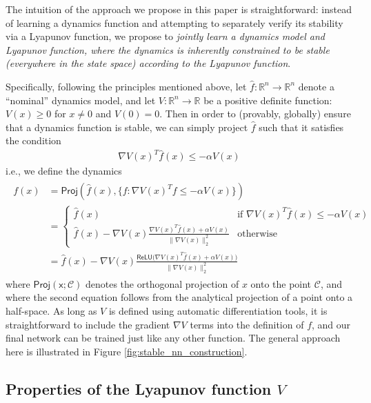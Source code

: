 The intuition of the approach we propose in this paper is straightforward: instead of learning a dynamics function and attempting to separately verify its stability via a Lyapunov function, we propose to \emph{jointly learn a dynamics model and Lyapunov function, where the dynamics is inherently constrained to be stable (everywhere in the state space) according to the Lyapunov function}.

Specifically, following the principles mentioned above, let $\hat{f} : \mathbb{R}^n \rightarrow \mathbb{R}^n$ denote a ``nominal'' dynamics model, and let $V : \mathbb{R}^n \rightarrow \mathbb{R}$ be a positive definite function: $V(x) \geq 0$ for $x \neq 0$ and $V(0) = 0$.  Then in order to (provably, globally) ensure that a dynamics function is stable, we can simply project $\hat{f}$ such that it satisfies the condition
\begin{align}
	\nabla V(x)^T \hat{f}(x) \leq -\alpha V(x)
\end{align}
i.e., we define the dynamics
\begin{align}
	\label{eq:dynamics}
	\begin{split}
		f(x) & =  \mathsf{Proj}\left(\hat{f}(x), \{f: \nabla V(x)^T f \leq -\alpha V(x)\}\right) \\
		& = \begin{cases} \hat{f}(x) & \mbox{if } \nabla V(x)^T \hat{f}(x) \leq -\alpha V(x) \\
              \hat{f}(x) - \nabla V(x)\frac{\nabla V(x)^T \hat{f}(x) + \alpha V (x)}{\|\nabla V(x)\|_2^2}
                         & \mbox{otherwise}\end{cases} \\
		& = \hat{f}(x) - \nabla V(x)\frac{\mathsf{ReLU}\bigl(\nabla V(x)^T \hat{f}(x) + \alpha V (x) \bigr)}{\|\nabla V(x)\|_2^2}
	\end{split}
\end{align}
where $\mathsf{Proj(x;\mathcal{C})}$ denotes the orthogonal projection of $x$ onto the point $\mathcal{C}$, and where the second equation follows from the analytical projection of a point onto a half-space.  As long as $V$ is defined using automatic differentiation tools, it is straightforward to include the gradient $\nabla V$ terms into the definition of $f$, and our final network can be trained just like any other function.   The general approach here is illustrated in Figure \ref{fig:stable_nn_construction}.



\subsection[Properties of the Lyapunov function]{Properties of the Lyapunov function $V$}\label{sec:lyapunov_properties}

